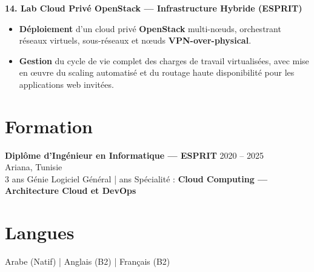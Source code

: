 \documentclass[10pt, letterpaper]{article}
\newenvironment{highlights}{
\begin{itemize}[leftmargin=12pt, itemsep=2pt]
}{
\end{itemize}
}
\begin{document}
\textbf{14. Lab Cloud Privé OpenStack --- Infrastructure Hybride (ESPRIT)}
\begin{highlights}
\item \textbf{Déploiement} d'un cloud privé \textbf{OpenStack} multi-nœuds, orchestrant réseaux virtuels, sous-réseaux et nœuds \textbf{VPN-over-physical}.
\item \textbf{Gestion} du cycle de vie complet des charges de travail virtualisées, avec mise en œuvre du scaling automatisé et du routage haute disponibilité pour les applications web invitées.
\end{highlights}

\section{Formation}
\textbf{Diplôme d'Ingénieur en Informatique --- ESPRIT} \hfill 2020 -- 2025 \\
Ariana, Tunisie \\
3 ans Génie Logiciel Général \;| ans Spécialité : \textbf{Cloud Computing --- Architecture Cloud et DevOps}

\section{Langues}
Arabe (Natif) \;|\; Anglais (B2) \;|\; Français (B2)
\end{document}
